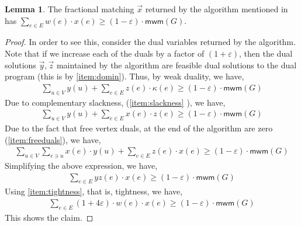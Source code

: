 \documentclass[a4paper,11pt]{article}
\newcommand{\eps}{\varepsilon}
\theoremstyle{definition}
\theoremstyle{definition}
\theoremstyle{definition}
\theoremstyle{definition}
\theoremstyle{definition}
\newtheorem{lemma2}[definition2]{Lemma}
\theoremstyle{definition}
\theoremstyle{definition}
\theoremstyle{definition}
\theoremstyle{definition}
\theoremstyle{definition}
\theoremstyle{definition}
\theoremstyle{definition}
\theoremstyle{definition}
\theoremstyle{definition}
\theoremstyle{definition}
\begin{document}
\begin{lemma2}
The fractional matching $\vec{x}$ returned by the algorithm mentioned in  has $\sum_{e\in E}w(e)\cdot x(e)\geqslant (1-\eps)\cdot \textsf{mwm}(G)$.
\end{lemma2}

\begin{proof}
    In order to see this, consider the dual variables returned by the algorithm. Note that if we increase each of the duals by a factor of $(1+\eps)$, then the dual solutions $\vec{y},\vec{z}$ maintained by the algorithm are feasible dual solutions to the dual program (this is by \ref{item:domin}). Thus, by weak duality, we have,
    \begin{align*}
        \sum_{u\in V}y(u)+\sum_{e\in E} z(e)\cdot \kappa(e)\geqslant (1-\eps)\cdot \textsf{mwm}(G)
    \end{align*}
    Due to complementary slackness, (\ref{item:slackness}
    ), we have,
    \begin{align*}
        \sum_{u\in V} y(u) +\sum_{e\in E} x(e)\cdot z(e) \geqslant (1-\eps)\cdot \textsf{mwm}(G)
    \end{align*}
Due to the fact that free vertex duals, at the end of the algorithm are zero (\ref{item:freeduals}), we have, 
\begin{align*}
    \sum_{u\in V}\sum_{e\ni u} x(e)\cdot y(u)+\sum_{e\in E} z(e)\cdot x(e)\geqslant (1-\eps)\cdot \textsf{mwm}(G)
\end{align*}
Simplifying the above expression, we have,
\begin{align*}
    \sum_{e\in E}yz(e)\cdot x(e)\geqslant (1-\eps)\cdot \textsf{mwm}(G)
\end{align*}
Using \ref{item:tightness}, that is, tightness, we have, 
\begin{align*}
    \sum_{e\in E} (1+4\eps)\cdot w(e)\cdot x(e)\geqslant (1-\eps)\cdot \textsf{mwm}(G)
\end{align*}
This shows the claim.
\end{proof}
\end{document}
